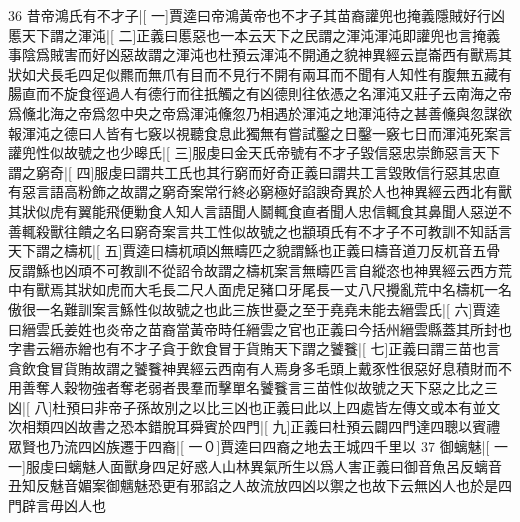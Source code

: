 36
昔帝鴻氏有不才子|[%
一]賈逵曰帝鴻黃帝也不才子其苗裔讙兜也掩義隱賊好行凶慝天下謂之渾沌|[%
二]正義曰慝惡也一本云天下之民謂之渾沌渾沌即讙兜也言掩義事陰爲賊害而好凶惡故謂之渾沌也杜預云渾沌不開通之貌神異經云崑崙西有獸焉其狀如犬長毛四足似羆而無爪有目而不見行不開有兩耳而不聞有人知性有腹無五藏有腸直而不旋食徑過人有德行而往扺觸之有凶德則往依憑之名渾沌又莊子云南海之帝爲儵北海之帝爲忽中央之帝爲渾沌儵忽乃相遇於渾沌之地渾沌待之甚善儵與忽謀欲報渾沌之德曰人皆有七竅以視聽食息此獨無有嘗試鑿之日鑿一竅七日而渾沌死案言讙兜性似故號之也少暤氏|[%
三]服虔曰金天氏帝號有不才子毀信惡忠崇飾惡言天下謂之窮奇|[%
四]服虔曰謂共工氏也其行窮而好奇正義曰謂共工言毀敗信行惡其忠直有惡言語高粉飾之故謂之窮奇案常行終必窮極好諂諛奇異於人也神異經云西北有獸其狀似虎有翼能飛便勦食人知人言語聞人鬬輒食直者聞人忠信輒食其鼻聞人惡逆不善輒殺獸往饋之名曰窮奇案言共工性似故號之也顓頊氏有不才子不可教訓不知話言天下謂之檮杌|[%
五]賈逵曰檮杌頑凶無疇匹之貌謂鯀也正義曰檮音道刀反杌音五骨反謂鯀也凶頑不可教訓不從詔令故謂之檮杌案言無疇匹言自縱恣也神異經云西方荒中有獸焉其狀如虎而大毛長二尺人面虎足豬口牙尾長一丈八尺攪亂荒中名檮杌一名傲很一名難訓案言鯀性似故號之也此三族世憂之至于堯堯未能去縉雲氏|[%
六]賈逵曰縉雲氏姜姓也炎帝之苗裔當黃帝時任縉雲之官也正義曰今括州縉雲縣蓋其所封也字書云縉赤繒也有不才子貪于飲食冒于貨賄天下謂之饕餮|[%
七]正義曰謂三苗也言貪飲食冒貨賄故謂之饕餮神異經云西南有人焉身多毛頭上戴豕性很惡好息積財而不用善奪人穀物強者奪老弱者畏羣而擊單名饕餮言三苗性似故號之天下惡之比之三凶|[%
八]杜預曰非帝子孫故別之以比三凶也正義曰此以上四處皆左傳文或本有並文次相類四凶故書之恐本錯脫耳舜賓於四門|[%
九]正義曰杜預云闢四門達四聰以賓禮眾賢也乃流四凶族遷于四裔|[%
一０]賈逵曰四裔之地去王城四千里以
37
御螭魅|[%
一一]服虔曰螭魅人面獸身四足好惑人山林異氣所生以爲人害正義曰御音魚呂反螭音丑知反魅音媚案御魑魅恐更有邪諂之人故流放四凶以禦之也故下云無凶人也於是四門辟言毋凶人也

